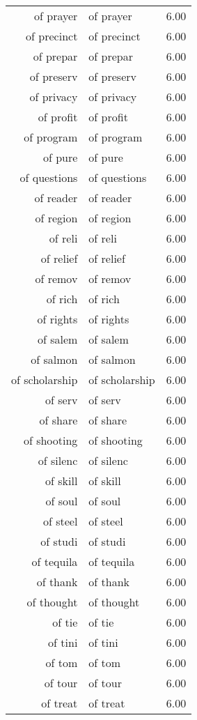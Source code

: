 \begin{table}[ht]
\begin{tabular}{rlr}
  of prayer & of prayer & 6.00 \\ 
  of precinct & of precinct & 6.00 \\ 
  of prepar & of prepar & 6.00 \\ 
  of preserv & of preserv & 6.00 \\ 
  of privacy & of privacy & 6.00 \\ 
  of profit & of profit & 6.00 \\ 
  of program & of program & 6.00 \\ 
  of pure & of pure & 6.00 \\ 
  of questions & of questions & 6.00 \\ 
  of reader & of reader & 6.00 \\ 
  of region & of region & 6.00 \\ 
  of reli & of reli & 6.00 \\ 
  of relief & of relief & 6.00 \\ 
  of remov & of remov & 6.00 \\ 
  of rich & of rich & 6.00 \\ 
  of rights & of rights & 6.00 \\ 
  of salem & of salem & 6.00 \\ 
  of salmon & of salmon & 6.00 \\ 
  of scholarship & of scholarship & 6.00 \\ 
  of serv & of serv & 6.00 \\ 
  of share & of share & 6.00 \\ 
  of shooting & of shooting & 6.00 \\ 
  of silenc & of silenc & 6.00 \\ 
  of skill & of skill & 6.00 \\ 
  of soul & of soul & 6.00 \\ 
  of steel & of steel & 6.00 \\ 
  of studi & of studi & 6.00 \\ 
  of tequila & of tequila & 6.00 \\ 
  of thank & of thank & 6.00 \\ 
  of thought & of thought & 6.00 \\ 
  of tie & of tie & 6.00 \\ 
  of tini & of tini & 6.00 \\ 
  of tom & of tom & 6.00 \\ 
  of tour & of tour & 6.00 \\ 
  of treat & of treat & 6.00 \\ 

\end{tabular}
\end{table}
